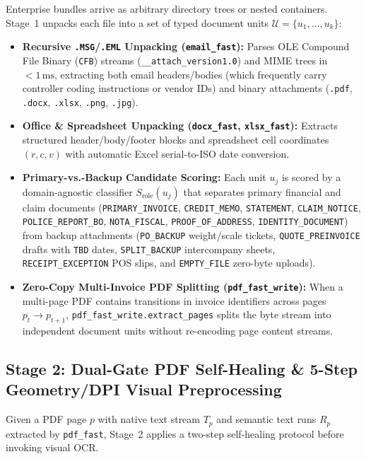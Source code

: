\documentclass[10pt,twocolumn,letterpaper]{article}
\begin{document}
Enterprise bundles arrive as arbitrary directory trees or nested containers. Stage~1 unpacks each file into a set of typed document units $\mathcal{U} = \{u_1, \dots, u_k\}$:
\begin{itemize}[leftmargin=1.3em,itemsep=1.5pt,topsep=2pt]
    \item \textbf{Recursive \texttt{.MSG}/\texttt{.EML} Unpacking (\texttt{email\_fast}):} Parses OLE Compound File Binary (\texttt{CFB}) streams (\texttt{\_\_attach\_version1.0}) and MIME trees in $<1\,\text{ms}$, extracting both email headers/bodies (which frequently carry controller coding instructions or vendor IDs) and binary attachments (\texttt{.pdf}, \texttt{.docx}, \texttt{.xlsx}, \texttt{.png}, \texttt{.jpg}).
    \item \textbf{Office \& Spreadsheet Unpacking (\texttt{docx\_fast}, \texttt{xlsx\_fast}):} Extracts structured header/body/footer blocks and spreadsheet cell coordinates $(r, c, v)$ with automatic Excel serial-to-ISO date conversion.
    \item \textbf{Primary-vs.-Backup Candidate Scoring:} Each unit $u_j$ is scored by a domain-agnostic classifier $S_{\text{role}}(u_j)$ that separates primary financial and claim documents (\texttt{PRIMARY\_INVOICE}, \texttt{CREDIT\_MEMO}, \texttt{STATEMENT}, \texttt{CLAIM\_NOTICE}, \texttt{POLICE\_REPORT\_BO}, \texttt{NOTA\_FISCAL}, \texttt{PROOF\_OF\_ADDRESS}, \texttt{IDENTITY\_DOCUMENT}) from backup attachments (\texttt{PO\_BACKUP} weight/scale tickets, \texttt{QUOTE\_PREINVOICE} drafts with \texttt{TBD} dates, \texttt{SPLIT\_BACKUP} intercompany sheets, \texttt{RECEIPT\_EXCEPTION} POS slips, and \texttt{EMPTY\_FILE} zero-byte uploads).
    \item \textbf{Zero-Copy Multi-Invoice PDF Splitting (\texttt{pdf\_fast\_write}):} When a multi-page PDF contains transitions in invoice identifiers across pages $p_t \to p_{t+1}$, \texttt{pdf\_fast\_write.extract\_pages} splits the byte stream into independent document units without re-encoding page content streams.
\end{itemize}

\subsection{Stage 2: Dual-Gate PDF Self-Healing \& 5-Step Geometry/DPI Visual Preprocessing}

Given a PDF page $p$ with native text stream $T_p$ and semantic text runs $R_p$ extracted by \texttt{pdf\_fast}, Stage~2 applies a two-step self-healing protocol before invoking visual OCR.
\end{document}
